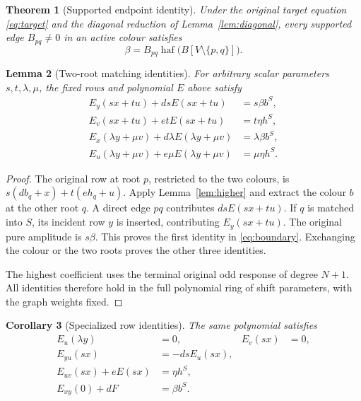 \documentclass[11pt]{article}
\newtheorem{theorem}{Theorem}[section]
\newtheorem{lemma}[theorem]{Lemma}
\newtheorem{corollary}[theorem]{Corollary}
\theoremstyle{definition}
\theoremstyle{plain}
\numberwithin{equation}{section}
\begin{document}
\begin{theorem}[Supported endpoint identity]\label{thm:endpoint}
Under the original target equation \eqref{eq:target} and the diagonal
reduction of Lemma~\ref{lem:diagonal}, every supported edge \(B_{pq}\ne0\)
in an active colour satisfies
\[
 \beta=B_{pq}\operatorname{haf}\bigl(B[V\setminus\{p,q\}]\bigr).
\]
\end{theorem}

\begin{lemma}[Two-root matching identities]\label{lem:boundary}
For arbitrary scalar parameters \(s,t,\lambda,\mu\), the fixed rows and
polynomial \(E\) above satisfy
\begin{equation}
 \begin{aligned}
 E_y(sx+tu)+dsE(sx+tu)&=s\beta b^S,\\
 E_v(sx+tu)+etE(sx+tu)&=t\eta h^S,\\
 E_x(\lambda y+\mu v)+d\lambda E(\lambda y+\mu v)&=\lambda\beta b^S,\\
 E_u(\lambda y+\mu v)+e\mu E(\lambda y+\mu v)&=\mu\eta h^S.
 \end{aligned}
 \tag{7}\label{eq:boundary}
\end{equation}
\end{lemma}

\begin{proof}
The original row at root
\(p\), restricted to the two colours, is
\(s(db_q+x)+t(eh_q+u)\). Apply Lemma~\ref{lem:higher} and extract the
colour \(b\) at the other root \(q\). A direct edge \(pq\) contributes
\(dsE(sx+tu)\). If \(q\) is matched into \(S\), its incident row
\(y\) is inserted, contributing \(E_y(sx+tu)\). The original pure
amplitude is \(s\beta\). This proves the first identity in \eqref{eq:boundary}.
Exchanging the colour or the two roots proves the other three identities.

The highest coefficient uses the terminal original odd response of degree
\(N+1\). All identities therefore hold in the full polynomial ring of shift
parameters, with the graph weights fixed.
\end{proof}

\begin{corollary}[Specialized row identities]\label{cor:specializations}
The same polynomial satisfies
\begin{equation}
 \begin{aligned}
 E_u(\lambda y)&=0,&E_v(sx)&=0,\\
 E_{yu}(sx)&=-dsE_u(sx),\\
 E_{uv}(sx)+eE(sx)&=\eta h^S,\\
 E_{xy}(0)+dF&=\beta b^S.
 \end{aligned}
 \tag{8}\label{eq:specializations}
\end{equation}
\end{corollary}
\end{document}
